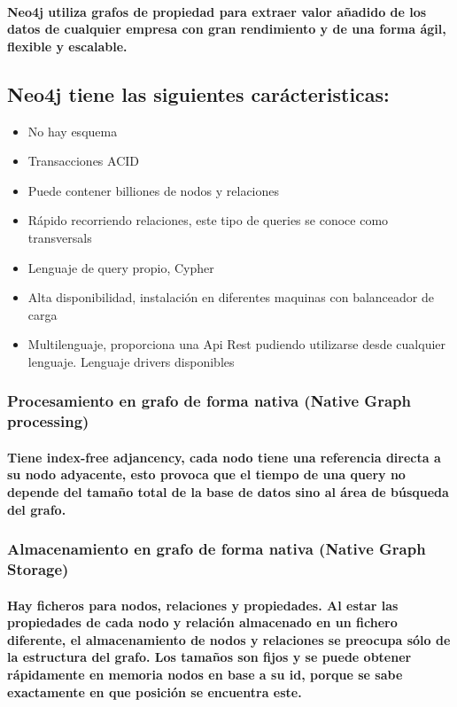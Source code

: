 	\paragraph{Neo4j utiliza grafos de propiedad para extraer valor añadido de los datos de cualquier empresa con gran rendimiento y de una forma ágil, flexible y escalable.}	
	
\subsection{Neo4j tiene las siguientes carácteristicas:}
\begin{itemize}
	\item No hay esquema
	\item Transacciones ACID
	\item Puede contener billiones de nodos y relaciones
	\item Rápido recorriendo relaciones, este tipo de queries se conoce como transversals
	\item Lenguaje de query propio, Cypher
	\item Alta disponibilidad, instalación en diferentes maquinas con balanceador de carga
	\item Multilenguaje, proporciona una Api Rest pudiendo utilizarse desde cualquier lenguaje. Lenguaje drivers 			disponibles
\end{itemize}   

\subsubsection{Procesamiento en grafo de forma nativa (Native Graph processing)}
    \paragraph{Tiene index-free adjancency, cada nodo tiene una referencia directa a su nodo adyacente, esto provoca    que el tiempo de una query no depende del tamaño total de la base de datos sino al área de búsqueda del grafo.}
\subsubsection{Almacenamiento en grafo de forma nativa (Native Graph Storage)}
 	\paragraph{Hay ficheros para nodos, relaciones y propiedades. Al estar las propiedades de cada nodo y relación almacenado en un fichero diferente, el almacenamiento de nodos y relaciones se preocupa sólo de la estructura del grafo. Los tamaños son fijos y se puede obtener rápidamente en memoria nodos en base a su id, porque se sabe exactamente en que posición se encuentra este.}
\newpage
